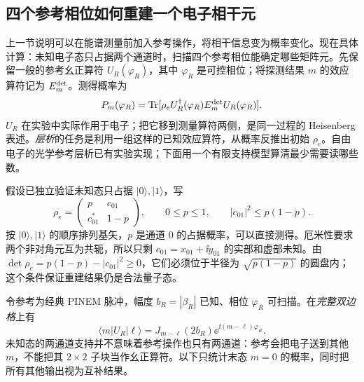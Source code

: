 \subsection{四个参考相位如何重建一个电子相干元}
\label{sec:electron-reference-tomography-worked}

上一节说明可以在能谱测量前加入参考操作，将相干信息变为概率变化。现在具体计算：未知电子态只占据两个通道时，扫描四个参考相位能确定哪些矩阵元。先保留一般的参考幺正算符 $U_R(\varphi_R)$，其中 $\varphi_R$ 是可控相位；将探测结果 $m$ 的效应算符记为 $E_m^{\rm det}$。测得概率为
\begin{equation}
 P_m(\varphi_R)=\operatorname{Tr}[\rho_e U_R^\dagger(\varphi_R)
 E_m^{\rm det}U_R(\varphi_R)].
 \label{eq:electron-reference-effect-rotation}
\end{equation}
$U_R$ 在实验中实际作用于电子；把它移到测量算符两侧，是同一过程的 Heisenberg 表述。\emph{层析}的任务是利用一组这样的已知效应算符，从概率反推出初始 $\rho_e$。自由电子的光学参考层析已有实验实现\cite{Priebe2017NatPhoton}；下面用一个有限支持模型算清最少需要读哪些数。

假设已独立验证未知态只占据 $|0\rangle,|1\rangle$，写
\begin{equation*}
 \rho_e=\begin{pmatrix}p&c_{01}\\c_{01}^*&1-p\end{pmatrix},\qquad
 0\le p\le1,\qquad |c_{01}|^2\le p(1-p).
\end{equation*}
按 $|0\rangle,|1\rangle$ 的顺序排列基矢，$p$ 是通道 $0$ 的占据概率，可以直接测得。厄米性要求两个非对角元互为共轭，所以只剩 $c_{01}=x_{01}+\ii y_{01}$ 的实部和虚部未知。由 $\det\rho_e=p(1-p)-|c_{01}|^2\ge0$，它们必须位于半径为 $\sqrt{p(1-p)}$ 的圆盘内；这个条件保证重建结果仍是合法量子态。

令参考为经典 PINEM 脉冲，幅度 $b_R=|\beta_R|$ 已知、相位 $\varphi_R$ 可扫描。在\emph{完整双边格}上有
\begin{equation*}
 \langle m|U_R|\ell\rangle
 =J_{m-\ell}(2b_R)\ee^{\ii(m-\ell)\varphi_R}.
\end{equation*}
未知态的两通道支持并不意味着参考操作也只有两通道：参考会把电子送到其他 $m$，不能把其 $2\times2$ 子块当作幺正算符。以下只统计末态 $m=0$ 的概率，同时把所有其他输出视为互补结果。

